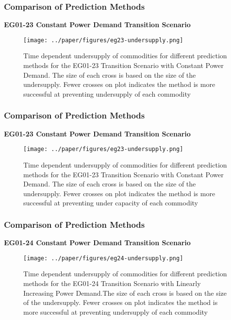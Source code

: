\begin{frame}
    \frametitle{Comparison of Prediction Methods}
\textbf{EG01-23 Constant Power Demand Transition Scenario}

\begin{figure}[htbp!]
    \begin{center}
      \texttt{[image: ../paper/figures/eg23-undersupply.png]}
    \end{center}
          \caption{Time dependent undersupply of commodities for different
          prediction methods for the EG01-23 Transition Scenario with Constant Power Demand. The
          size of each cross is based on the size of the undersupply.
          Fewer crosses on plot indicates the method is more successful at preventing undersupply 
          of each commodity}
  \end{figure}
\end{frame}

\begin{frame}
    \frametitle{Comparison of Prediction Methods}
    \textbf{EG01-23 Constant Power Demand Transition Scenario}
\begin{figure}[htbp!]
    \begin{center}
      \texttt{[image: ../paper/figures/eg23-undersupply.png]}
    \end{center}
          \caption{Time dependent undersupply of commodities for different
          prediction methods for the EG01-23 Transition Scenario with Constant Power Demand. The
          size of each cross is based on the size of the undersupply.
          Fewer crosses on plot indicates the method is more successful at preventing under capacity 
          of each commodity}
  \end{figure}
\end{frame}

\begin{frame}
    \frametitle{Comparison of Prediction Methods}
\textbf{EG01-24 Constant Power Demand Transition Scenario}
\begin{figure}[htbp!]
    \begin{center}
      \texttt{[image: ../paper/figures/eg24-undersupply.png]}
    \end{center}
          \caption{Time dependent undersupply of commodities for different
          prediction methods for the EG01-24 Transition Scenario with Linearly Increasing Power Demand.The
          size of each cross is based on the size of the undersupply.
          Fewer crosses on plot indicates the method is more successful at preventing undersupply 
          of each commodity}
  \end{figure}
\end{frame}

